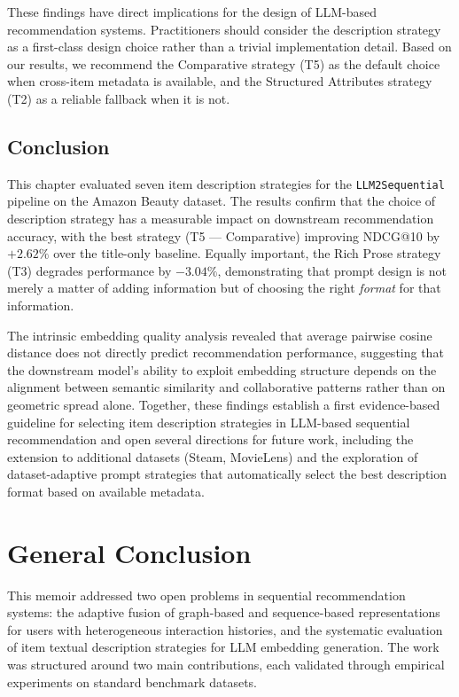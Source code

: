 \documentclass[12pt,a4paper]{report}
\begin{document}
These findings have direct implications for the design of LLM-based
recommendation systems. Practitioners should consider the description
strategy as a first-class design choice rather than a trivial
implementation detail. Based on our results, we recommend the
Comparative strategy (T5) as the default choice when cross-item metadata
is available, and the Structured Attributes strategy (T2) as a reliable
fallback when it is not.

\section{Conclusion}
\label{sec:ch5conclusion}

This chapter evaluated seven item description strategies for the
\texttt{LLM2Sequential} pipeline on the Amazon Beauty dataset. The results
confirm that the choice of description strategy has a measurable impact on
downstream recommendation accuracy, with the best strategy (T5 — Comparative)
improving NDCG@10 by $+2.62\%$ over the title-only baseline. Equally
important, the Rich Prose strategy (T3) degrades performance by $-3.04\%$,
demonstrating that prompt design is not merely a matter of adding information
but of choosing the right \emph{format} for that information.

The intrinsic embedding quality analysis revealed that average pairwise
cosine distance does not directly predict recommendation performance,
suggesting that the downstream model's ability to exploit embedding
structure depends on the alignment between semantic similarity and
collaborative patterns rather than on geometric spread alone. Together,
these findings establish a first evidence-based guideline for selecting
item description strategies in LLM-based sequential recommendation and
open several directions for future work, including the extension to
additional datasets (Steam, MovieLens) and the exploration of
dataset-adaptive prompt strategies that automatically select the best
description format based on available metadata.


\chapter*{General Conclusion}

This memoir addressed two open problems in sequential recommendation systems:
the adaptive fusion of graph-based and sequence-based representations for users
with heterogeneous interaction histories, and the systematic evaluation of item
textual description strategies for LLM embedding generation. The work was
structured around two main contributions, each validated through empirical
experiments on standard benchmark datasets.
\end{document}
